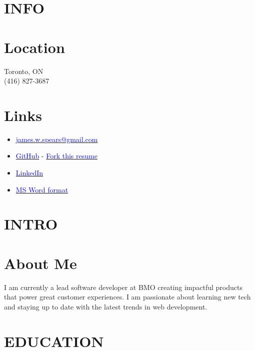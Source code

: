 \documentclass[margin]{res}
\begin{document}
\name{\textcolor{NavyBlue}{James Spears} \textcolor{black}{\bf Development Lead / Full Stack Developer} }

\begin{resume}

	\section{\textcolor{NavyBlue}{INFO}}

	\normalsize{\section{Location}}
	{Toronto, ON \\ (416) 827-3687}

	\normalsize{\section{Links}}
	\begin{itemize}
		\item \href{mailto:james.w.spears@gmail.com}{\textcolor{blue}{james.w.spears@gmail.com}}
		\item \href{https://github.com/james-spears}{\textcolor{blue}{GitHub}} - \href{https://github.com/james-spears/resume}{\textcolor{blue}{Fork this resume}}
		\item \href{https://www.linkedin.com/in/james-spears-50834b8a/}{\textcolor{blue}{LinkedIn}}
		\item \href{https://s3.amazonaws.com/james-spears.com/resume.docx}{\textcolor{blue}{MS Word format}}
	\end{itemize}

	\section{\textcolor{NavyBlue}{INTRO}}

	\normalsize{\section{About Me}}
	I am currently a lead software developer at BMO creating impactful products that power great customer experiences.
	I am passionate about learning new tech and staying up to date with the latest trends in web development.
	\section{\textcolor{NavyBlue}{EDUCATION}}


\end{resume}
\end{document}
